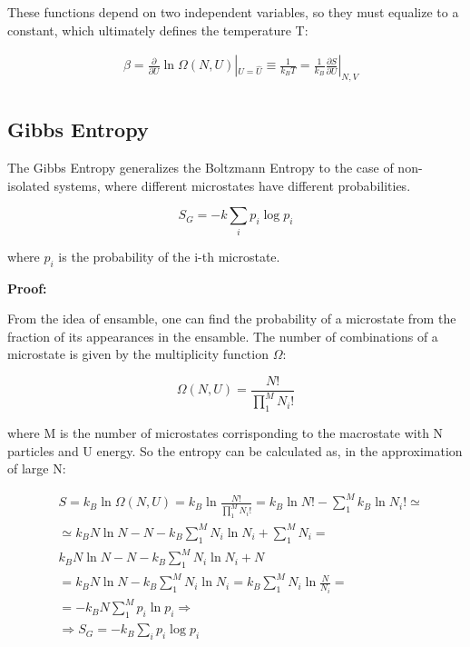 \documentclass{article}
\begin{document}
These functions depend on two independent variables, so they must equalize to a constant, which ultimately defines the temperature T:

\begin{align*}
     & \beta=\frac{\partial}{\partial U}\ln{\Omega(N,U)}|_{U=\hat{U}} \equiv \frac{1}{k_BT}= \frac{1}{k_B}\frac{\partial S}{\partial U}|_{N,V} \\
\end{align*}

\subsection{Gibbs Entropy}
The Gibbs Entropy generalizes the Boltzmann Entropy to the case of non-isolated systems, where different microstates have different probabilities.

\begin{tcolorbox}[colframe=gray!50, colback=gray!10, coltitle=black, title=Gibbs Entropy]
    \begin{equation}
        S_G = -k \sum_{i} p_i \log p_i
    \end{equation}

    where $p_i$ is the probability of the i-th microstate.
\end{tcolorbox}

\textbf{Proof:}

From the idea of ensamble, one can find the probability of a microstate from the fraction of its appearances in the ensamble.
The number of combinations of a microstate is given by the multiplicity function $\Omega$:

\begin{equation}
    \Omega(N,U)=\frac{N!}{\prod_{1}^{M}N_i!}
\end{equation}

where M is the number of microstates corrisponding to the macrostate with N particles and U energy.
So the entropy can be calculated as, in the approximation of large N:

\begin{center}
    \begin{align*}
         & S= k_B \ln{\Omega(N,U)}= k_B \ln{\frac{N!}{\prod_{1}^{M}N_i!}}= k_B \ln{N!}-\sum_{1}^{M}k_B \ln{N_i!} \simeq \\
         & \simeq k_B N \ln{N}-N-k_B \sum_{1}^{M}N_i \ln{N_i}+ \sum_{1}^{M}N_i =                                        \\
         & k_B N \ln{N}-N-k_B \sum_{1}^{M}N_i \ln{N_i}+N                                                                \\
         & = k_B N \ln{N}-k_B \sum_{1}^{M}N_i \ln{N_i} = k_B \sum_{1}^{M}N_i \ln{\frac{N}{N_i}}=                        \\
         & = -k_B N\sum_{1}^{M}p_i \ln{p_i} \Longrightarrow                                                             \\
         & \Longrightarrow S_G = -k_B \sum_{i} p_i \log p_i
    \end{align*}
\end{center}
\end{document}
